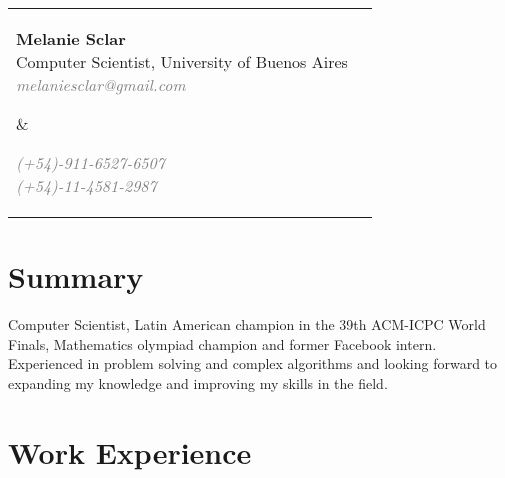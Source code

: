 \documentclass [a4paper, 11pt]{article}
\begin{document}
\noindent \begin{tabularx}{\textwidth}{X r}
  \hspace{-15pt}\parbox[t]{15cm}{
  \hspace{-2pt}\textbf{\huge{Melanie Sclar}} \\
  Computer Scientist, University of Buenos Aires \\
  \emph{ \textcolor{gray}{melaniesclar@gmail.com} }
  } &

\parbox[t]{3.8cm}{ \emph{\textcolor{gray}{
  (+54)-911-6527-6507 \\
  (+54)-11-4581-2987 }}
  
}
\end{tabularx}

\sectionfont{\sectionrule{0pt}{0pt}{-.2cm}{1pt}}
\section* {Summary}
Computer Scientist, Latin American champion in the 39th ACM-ICPC World Finals, Mathematics olympiad 
champion and former Facebook intern. Experienced in problem solving and complex algorithms and 
looking forward to expanding my knowledge and improving my skills in the field.

\section* {Work Experience}
\end{document}
